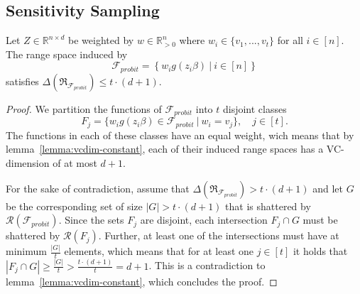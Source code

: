 \subsection{Sensitivity Sampling}




\begin{lemma}
    Let $Z \in \mathbb{R}^{n \times d}$ be weighted by
    $w \in \mathbb{R}^n_{>0}$ where $w_i \in \{ v_1, ..., v_t \}$ for
    all $i \in [n]$.
    The range space induced by
    \begin{equation*}
        \mathcal{F}_{probit} = \left\{ w_ig(z_i\beta) \ |\ i \in [n] \right\}
    \end{equation*}
    satisfies
    $\Delta(\mathfrak{R}_{\mathcal{F}_{probit}}) \leq t \cdot (d + 1)$.
\end{lemma}
\begin{proof}
    We partition the functions of $\mathcal{F}_{probit}$ into $t$ disjoint
    classes
    \begin{equation*}
        F_j = \{ w_ig(z_i\beta) \in \mathcal{F}_{probit} \
        |\ w_i = v_j \},\quad j \in [t].
    \end{equation*}
    The functions in each of these classes have an equal
    weight, wich means that by lemma~\ref{lemma:vcdim-constant}, each of
    their induced range spaces has a VC-dimension of at most $d+1$.

    For the sake of contradiction, assume that
    $\Delta(\mathfrak{R}_{\mathcal{F}_{probit}}) > t \cdot (d + 1)$ and let
    $G$ be the corresponding set of size $|G| > t \cdot (d + 1)$ that
    is shattered by $\mathcal{R}(\mathcal{F}_{probit})$.
    Since the sets $F_j$ are disjoint, each intersection
    $F_j \cap G$ must be shattered by $\mathcal{R}(F_j)$.
    Further, at least one of the intersections must have at minimum
    $\frac{|G|}{t}$ elements, which means that for at least one $j \in [t]$
    it holds that
    $|F_j \cap G| \geq \frac{|G|}{t} > \frac{t \cdot (d+1)}{t} = d + 1$.
    This is a contradiction to lemma~\ref{lemma:vcdim-constant}, which
    concludes the proof.
\end{proof}
